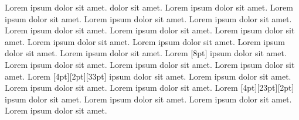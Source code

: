 \documentclass{article}
\begin{document}
Lorem ipsum dolor sit amet.  dolor sit amet. Lorem ipsum dolor sit amet.
Lorem ipsum dolor sit amet. 
Lorem ipsum dolor sit amet. Lorem ipsum dolor sit amet. Lorem ipsum dolor sit amet.
Lorem ipsum dolor sit amet. Lorem ipsum dolor sit amet.
Lorem   ipsum dolor sit amet.
Lorem ipsum dolor sit amet. Lorem ipsum dolor sit amet. Lorem ipsum dolor sit amet.
Lorem [8pt] ipsum dolor sit amet.
Lorem ipsum dolor sit amet. Lorem ipsum dolor sit amet. Lorem ipsum dolor sit amet.
Lorem [4pt][2pt][33pt] ipsum dolor sit amet.
Lorem ipsum dolor sit amet. Lorem ipsum dolor sit amet. Lorem ipsum dolor sit amet.
Lorem [4pt][23pt][2pt] ipsum dolor sit amet.
Lorem ipsum dolor sit amet. Lorem ipsum dolor sit amet. Lorem ipsum dolor sit amet.
\end{document}
